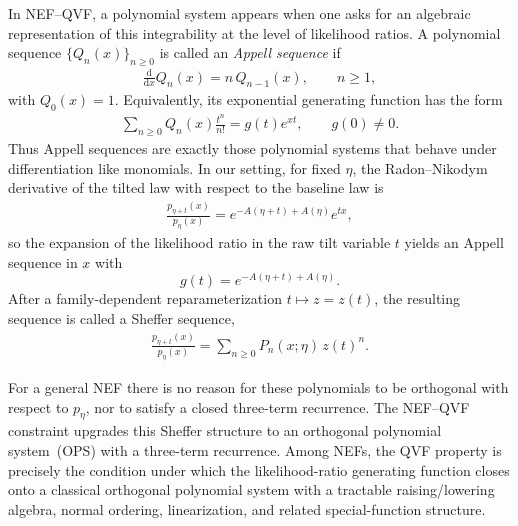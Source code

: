 \documentclass[a4paper,11pt]{article}
\numberwithin{equation}{section}
\theoremstyle{plain}
\theoremstyle{definition}
\theoremstyle{remark}
\newcommand{\1}{\ensuremath{\mathds{1}}\xspace}
\newcommand{\dd}{\ensuremath{{\textrm{d}}}\xspace}
\begin{document}
In NEF--QVF, a polynomial system appears when one asks for an algebraic representation of this integrability
at the level of likelihood ratios. 
A polynomial sequence \(\{Q_n(x)\}_{n\ge0}\) is called an \emph{Appell sequence} if
\begin{align}
\frac{\dd}{\dd x}Q_n(x)=n\,Q_{n-1}(x),
\qquad n\ge1,
\end{align}
with \(Q_0(x)=1\). Equivalently, its exponential generating function has the form
\begin{align}
\sum_{n\ge0}Q_n(x)\frac{t^n}{n!}=g(t)e^{xt},
\qquad g(0)\neq0.
\end{align}
Thus Appell sequences are exactly those polynomial systems that behave under differentiation like monomials. In our setting, for fixed \(\eta\), the Radon--Nikodym derivative of
the tilted law with respect to the baseline law is
\begin{align}
\frac{p_{\eta+t}(x)}{p_\eta(x)}
=e^{-A(\eta+t)+A(\eta)}e^{tx},\label{eq:nef-ratio}
\end{align}
so the expansion of the likelihood ratio in the raw tilt variable \(t\) yields an Appell sequence in \(x\) with
\[
g(t)=e^{-A(\eta+t)+A(\eta)}.
\] After a family-dependent reparameterization \(t\mapsto z=z(t)\), the resulting sequence is called a Sheffer sequence,
\begin{align}
\frac{p_{\eta+t}(x)}{p_\eta(x)}
=\sum_{n\ge 0} P_n(x;\eta)\,z(t)^n.
\end{align}

For a general NEF there is no reason for these polynomials to be orthogonal with respect to \(p_\eta\), nor to
satisfy a closed three-term recurrence. The NEF--QVF constraint upgrades this Sheffer structure to an
orthogonal polynomial system~(OPS) with a three-term recurrence. Among NEFs, the QVF property is precisely
the condition under which the likelihood-ratio generating function closes onto a classical orthogonal
polynomial system with a tractable raising/lowering algebra, normal ordering, linearization, and related
special-function structure.
\end{document}

